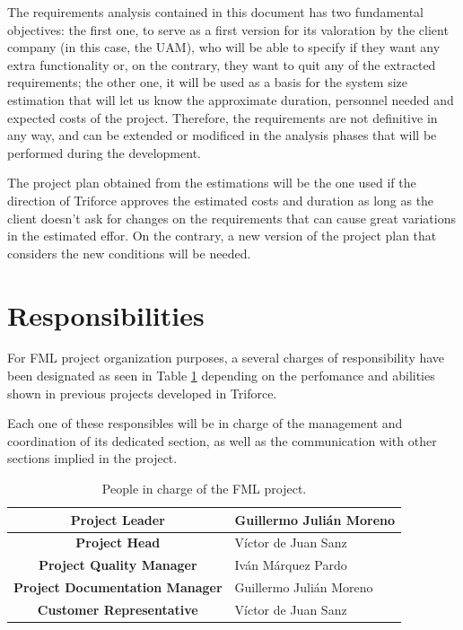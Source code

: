 \documentclass[11pt]{report}
\begin{document}
The requirements analysis contained in this document has two fundamental objectives: the first one, to serve as a first version for its valoration by the client company (in this case, the UAM), who will be able to specify if they want any extra functionality or, on the contrary, they want to quit any of the extracted requirements; the other one, it will be used as a basis for the system size estimation that will let us know the approximate duration, personnel needed and expected costs of the project. Therefore, the requirements are not definitive in any way, and can be extended or modificed in the analysis phases that will be performed during the development.

The project plan obtained from the estimations will be the one used if the direction of Triforce approves the estimated costs and duration as long as the client doesn't ask for changes on the requirements that can cause great variations in the estimated effor. On the contrary, a new version of the project plan that considers the new conditions will be needed.

\section{Responsibilities}

For FML project organization purposes, a several charges of responsibility have been designated as seen in Table \ref{tbl_Responsibilities} depending on the perfomance and abilities shown in previous projects developed in Triforce.

Each one of these responsibles will be in charge of the management and coordination of its dedicated section, as well as the communication with other sections implied in the project.


\begin{table}[hbtp]
\centering
\begin{tabular}{|c|p{5cm}|} \hline
\textbf{Project Leader} & Guillermo Julián Moreno \\ \hline
\textbf{Project Head} & Víctor de Juan Sanz \\ \hline
\textbf{Project Quality Manager} & Iván Márquez Pardo \\ \hline
\textbf{Project Documentation Manager} & Guillermo Julián Moreno \\ \hline
\textbf{Customer Representative} & Víctor de Juan Sanz \\ \hline
\end{tabular}
\caption{People in charge of the FML project.}
\label{tbl_Responsibilities}
\end{table}
\end{document}

